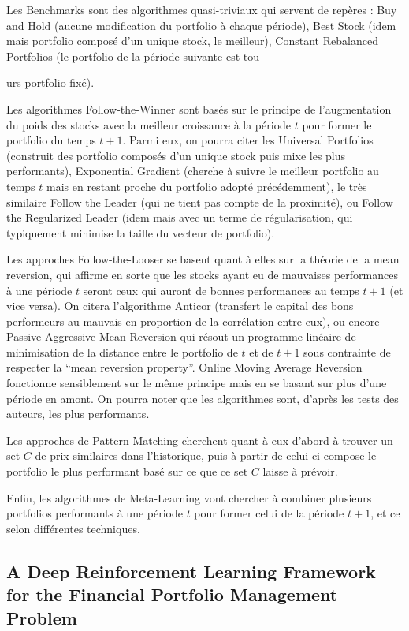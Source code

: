 \documentclass[a4paper]{article}
\begin{document}
Les Benchmarks sont des algorithmes quasi-triviaux qui servent de repères : Buy and Hold (aucune modification du portfolio à chaque période), Best Stock (idem mais portfolio composé d'un unique stock, le meilleur), Constant Rebalanced Portfolios (le portfolio de la période suivante est tou
{
	urs portfolio fixé).

	Les algorithmes Follow-the-Winner sont basés sur le principe de l'augmentation du poids des stocks avec la meilleur croissance à la période $t$ pour former le portfolio du temps $t+1$. Parmi eux, on pourra citer les Universal Portfolios (construit des portfolio composés d'un unique stock puis mixe les plus performants), Exponential Gradient (cherche à suivre le meilleur portfolio au temps $t$ mais en restant proche du portfolio adopté précédemment), le très similaire Follow the Leader (qui ne tient pas compte de la proximité), ou Follow the Regularized Leader (idem mais avec un terme de régularisation, qui typiquement minimise la taille du vecteur de portfolio).

	Les approches Follow-the-Looser se basent quant à elles sur la théorie de la mean reversion, qui affirme en sorte que les stocks ayant eu de mauvaises performances à une période $t$ seront ceux qui auront de bonnes performances au temps $t+1$ (et vice versa). On citera l'algorithme Anticor (transfert le capital des bons performeurs au mauvais en proportion de la corrélation entre eux), ou encore Passive Aggressive Mean Reversion qui résout un programme linéaire de minimisation de la distance entre le portfolio de $t$ et de $t+1$ sous contrainte de respecter la ``mean reversion property''. Online Moving Average Reversion fonctionne sensiblement sur le même principe mais en se basant sur plus d'une période en amont. On pourra noter que les algorithmes sont, d'après les tests des auteurs, les plus performants.

	Les approches de Pattern-Matching cherchent quant à eux d'abord à trouver un set $C$ de prix similaires dans l'historique, puis à partir de celui-ci compose le portfolio le plus performant basé sur ce que ce set $C$ laisse à prévoir.

	Enfin, les algorithmes de Meta-Learning vont chercher à combiner plusieurs portfolios performants à une période $t$ pour former celui de la période $t+1$, et ce selon différentes techniques.

	\subsection{A Deep Reinforcement Learning Framework for the Financial Portfolio Management Problem}

}
\end{document}
